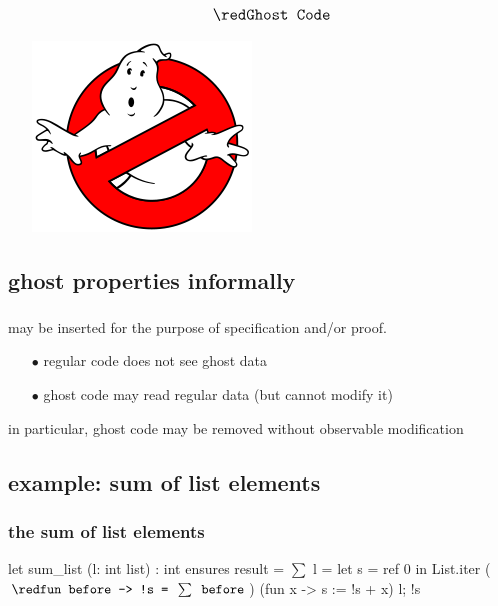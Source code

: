 \begin{frame}
 \begin{itemize}
 	\item[] $${\large \red \texttt{Ghost Code}}$$
 	\begin{center}
 	\includegraphics[scale=0.31]{GhostBusters}
 	\end{center} 
 \end{itemize}
\end{frame}
\addtocounter{framenumber}{-1}

\subsection*{ghost properties informally}

\begin{frame}
\frametitle{}
	may be inserted for the purpose of specification and/or proof. \\[1em]
	\pause	
	\begin{itemize}
	\item[\red $\bullet$] regular code does not see ghost data
	\item[\red $\bullet$] ghost code may read regular data (but cannot modify it)\\[1em]
	\end{itemize}
in particular, ghost code may be removed without observable modification
\end{frame}


\subsection*{example: sum of list elements} 
\begin{frame}[fragile]
\frametitle{the sum of list elements}
\begin{footnotesize}
\begin{whycode}
 let sum_list (l: int list) : int
 ensures { result = $\sum$ l }
 = let s = ref 0 in
   List.iter 
     (${\red\texttt{fun before -> !s = }\sum \texttt{ before}}$) (fun x -> s := !s + x) l; 
   !s     
\end{whycode}
\end{footnotesize}
\end{frame}

